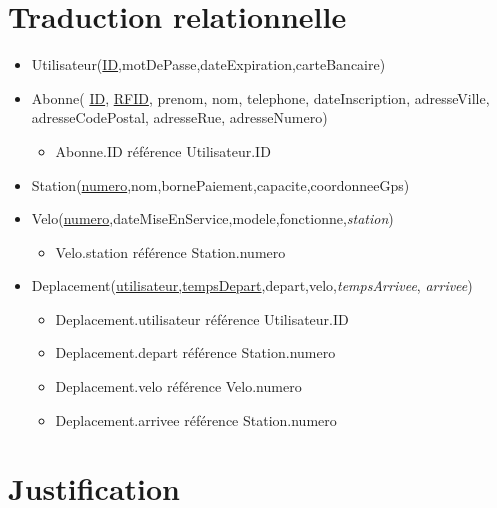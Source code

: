 \documentclass[a4paper, 12pt]{report}
\begin{document}
\section*{Traduction relationnelle} %
	
	\begin{itemize}
	
		\item Utilisateur(\underline{ID},motDePasse,dateExpiration,carteBancaire)
		
		\item Abonne( \underline{ID}, \underline{RFID}, prenom, nom, telephone, dateInscription, adresseVille, adresseCodePostal, adresseRue, adresseNumero)
		
		\begin{itemize}
			\item Abonne.ID référence Utilisateur.ID
		\end{itemize}
		
		\item Station(\underline{numero},nom,bornePaiement,capacite,coordonneeGps)
		
		\item Velo(\underline{numero},dateMiseEnService,modele,fonctionne,\textit{station})
		
		\begin{itemize}
			\item Velo.station référence Station.numero
		\end{itemize}
		
		\item Deplacement(\underline{utilisateur,tempsDepart},depart,velo,\textit{tempsArrivee}, \textit{arrivee})
		
		\begin{itemize}
			\item Deplacement.utilisateur référence Utilisateur.ID
			\item Deplacement.depart référence Station.numero
			\item Deplacement.velo référence Velo.numero
			\item Deplacement.arrivee référence Station.numero
		\end{itemize}
		
	\end{itemize}

\section*{Justification} %
\end{document}

